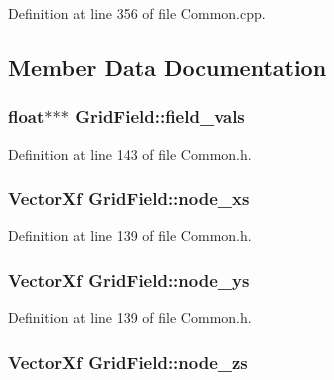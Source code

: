 Definition at line 356 of file Common.\+cpp.



\subsection{Member Data Documentation}
\subsubsection[{\texorpdfstring{field\+\_\+vals}{field_vals}}]{\setlength{\rightskip}{0pt plus 5cm}float$\ast$$\ast$$\ast$ Grid\+Field\+::field\+\_\+vals}\hypertarget{struct_grid_field_a46802a85d9533d4371d12597f0247c7d}{}\label{struct_grid_field_a46802a85d9533d4371d12597f0247c7d}


Definition at line 143 of file Common.\+h.

\subsubsection[{\texorpdfstring{node\+\_\+xs}{node_xs}}]{\setlength{\rightskip}{0pt plus 5cm}Vector\+Xf Grid\+Field\+::node\+\_\+xs}\hypertarget{struct_grid_field_a14f0f8f41ce92d7e5ab4c539ef9bc495}{}\label{struct_grid_field_a14f0f8f41ce92d7e5ab4c539ef9bc495}


Definition at line 139 of file Common.\+h.

\subsubsection[{\texorpdfstring{node\+\_\+ys}{node_ys}}]{\setlength{\rightskip}{0pt plus 5cm}Vector\+Xf Grid\+Field\+::node\+\_\+ys}\hypertarget{struct_grid_field_a07e209546d687dd58557871744f7a9a6}{}\label{struct_grid_field_a07e209546d687dd58557871744f7a9a6}


Definition at line 139 of file Common.\+h.

\subsubsection[{\texorpdfstring{node\+\_\+zs}{node_zs}}]{\setlength{\rightskip}{0pt plus 5cm}Vector\+Xf Grid\+Field\+::node\+\_\+zs}\hypertarget{struct_grid_field_ab97e893cedd450d502165bcb7e3ed7ca}{}\label{struct_grid_field_ab97e893cedd450d502165bcb7e3ed7ca}


